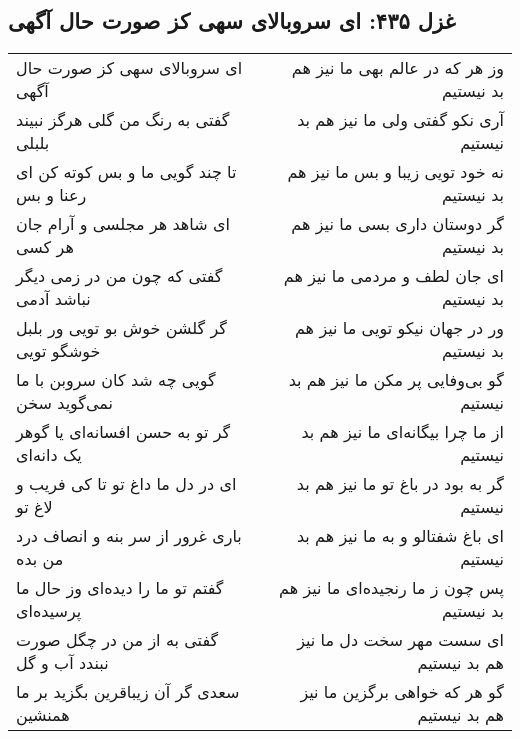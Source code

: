 \begin{center}
\section*{غزل ۴۳۵: ای سروبالای سهی کز صورت حال آگهی}
\label{sec:435}
\begin{longtable}{l p{0.5cm} r}
ای سروبالای سهی کز صورت حال آگهی
&&
وز هر که در عالم بهی ما نیز هم بد نیستیم
\\
گفتی به رنگ من گلی هرگز نبیند بلبلی
&&
آری نکو گفتی ولی ما نیز هم بد نیستیم
\\
تا چند گویی ما و بس کوته کن ای رعنا و بس
&&
نه خود تویی زیبا و بس ما نیز هم بد نیستیم
\\
ای شاهد هر مجلسی و آرام جان هر کسی
&&
گر دوستان داری بسی ما نیز هم بد نیستیم
\\
گفتی که چون من در زمی دیگر نباشد آدمی
&&
ای جان لطف و مردمی ما نیز هم بد نیستیم
\\
گر گلشن خوش بو تویی ور بلبل خوشگو تویی
&&
ور در جهان نیکو تویی ما نیز هم بد نیستیم
\\
گویی چه شد کان سروبن با ما نمی‌گوید سخن
&&
گو بی‌وفایی پر مکن ما نیز هم بد نیستیم
\\
گر تو به حسن افسانه‌ای یا گوهر یک دانه‌ای
&&
از ما چرا بیگانه‌ای ما نیز هم بد نیستیم
\\
ای در دل ما داغ تو تا کی فریب و لاغ تو
&&
گر به بود در باغ تو ما نیز هم بد نیستیم
\\
باری غرور از سر بنه و انصاف درد من بده
&&
ای باغ شفتالو و به ما نیز هم بد نیستیم
\\
گفتم تو ما را دیده‌ای وز حال ما پرسیده‌ای
&&
پس چون ز ما رنجیده‌ای ما نیز هم بد نیستیم
\\
گفتی به از من در چگل صورت نبندد آب و گل
&&
ای سست مهر سخت دل ما نیز هم بد نیستیم
\\
سعدی گر آن زیباقرین بگزید بر ما همنشین
&&
گو هر که خواهی برگزین ما نیز هم بد نیستیم
\\
\end{longtable}
\end{center}
